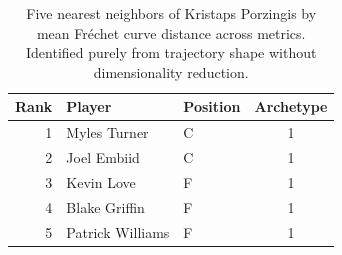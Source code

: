 \begin{table}[htbp]
  \centering\small
  \begin{tabular}{rllc}
    \toprule
    Rank & Player & Position & Archetype \\
    \midrule
    1 & Myles Turner & C & 1 \\
    2 & Joel Embiid & C & 1 \\
    3 & Kevin Love & F & 1 \\
    4 & Blake Griffin & F & 1 \\
    5 & Patrick Williams & F & 1 \\
    \bottomrule
  \end{tabular}
  \caption{Five nearest neighbors of Kristaps Porzingis by mean Fr\'{e}chet curve distance across metrics. Identified purely from trajectory shape without dimensionality reduction.}
  \label{tab:Kristaps_Porzingis_frechet_curve_neighbors}
\end{table}

